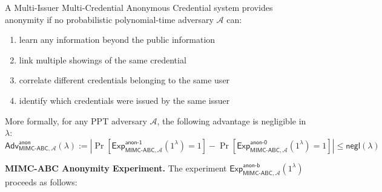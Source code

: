 \begin{definition}
A Multi-Issuer Multi-Credential Anonymous Credential system provides anonymity if no probabilistic polynomial-time adversary $\mathcal{A}$ can:

\begin{enumerate}
    \item learn any information beyond the public information
    \item link multiple showings of the same credential
    \item correlate different credentials belonging to the same user
    \item identify which credentials were issued by the same issuer
\end{enumerate}

\noindent More formally, for any PPT adversary $\mathcal{A}$, the following advantage is negligible in $\lambda$:
\[ \mathsf{Adv}^{\mathsf{anon}}_{\mathsf{MIMC\mbox{-}ABC},\mathcal{A}}(\lambda) := |\Pr[\mathsf{Exp}^{\mathsf{anon\mbox{-}1}}_{\mathsf{MIMC\mbox{-}ABC},\mathcal{A}}(1^\lambda) = 1] - \Pr[\mathsf{Exp}^{\mathsf{anon\mbox{-}0}}_{\mathsf{MIMC\mbox{-}ABC},\mathcal{A}}(1^\lambda) = 1]| \leq \mathsf{negl}(\lambda) \]
\end{definition}


\noindent \textbf{MIMC-ABC Anonymity Experiment.} 
The experiment $\mathsf{Exp}^{\mathsf{anon\mbox{-}b}}_{\mathsf{MIMC\mbox{-}ABC},\mathcal{A}}(1^\lambda)$ proceeds as follows:

